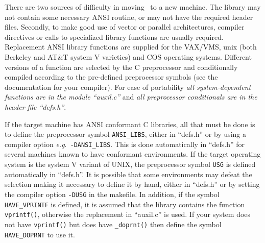 There are two sources of difficulty in moving \moldy\  to a new machine.
The library may not contain some necessary ANSI routine, or
may not have the required header files.  Secondly, to make good use of
vector or parallel architectures, compiler directives or calls to
specialized library functions are usually required.
Replacement ANSI library functions are supplied for the VAX/VMS,
unix (both Berkeley and AT\&T system V varieties) and COS operating
systems.  Different versions of a function are selected by the C
preprocessor and conditionally compiled according to the pre-defined
preprocessor symbols (see the documentation for your compiler).  For
ease of portability {\em all system-dependent functions are in the
module ``auxil.c''\/} and {\em all preprocessor conditionals are in the
header file ``defs.h''}.

If the target machine has ANSI conformant C libraries, all that must
be done is to define the preprocessor symbol \verb+ANSI_LIBS+, either
in ``defs.h'' or by using a compiler option {\em e.g}.\
\verb+-DANSI_LIBS+.  This is done automatically in ``defs.h'' for
several machines known to have conformant environments.  If the target
operating system is the system V variant of UNIX, the preprocessor
symbol \verb'USG' is defined automatically in ``defs.h''.  It is
possible that some environments may defeat the selection making it
necessary to define it by hand, either in ``defs.h'' or by setting
the compiler option \verb'-DUSG' in the makefile. In addition, if the
symbol \verb'HAVE_VPRINTF' is defined, it is assumed that the library
contains the function \verb'vprintf()', otherwise the replacement in
``auxil.c'' is used. If your system does not have \verb'vprintf()' but
does have \verb'_doprnt()' then define the symbol \verb'HAVE_DOPRNT'
to use it.

